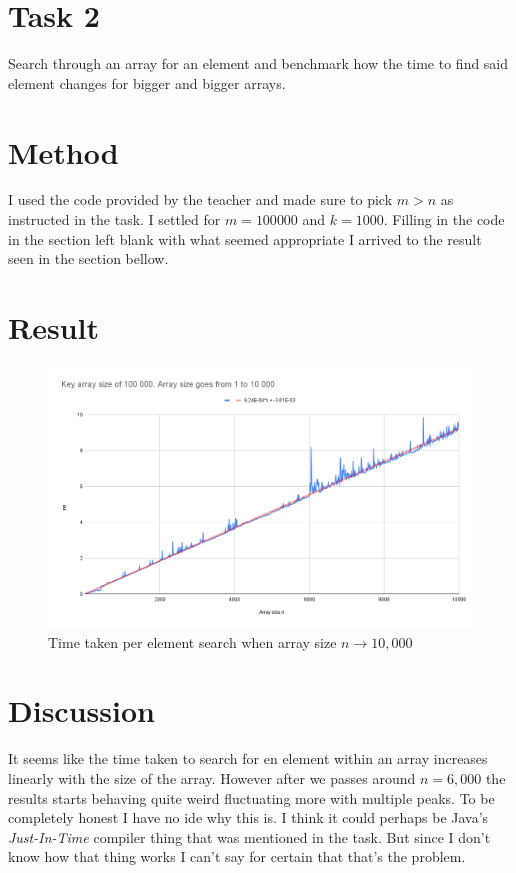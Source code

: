 \documentclass[a4paper,11pt]{article}
\begin{document}
\section*{Task 2}

Search through an array for an element and benchmark how the time to find said element changes for bigger and bigger arrays. 

\section*{Method}

I used the code provided by the teacher and made sure to pick $m > n$ as instructed in the task. I settled for $m = 100 000$ and $k = 1000$.
 Filling in the code in the section left blank with what seemed appropriate I arrived to the result seen in the section bellow. 

\section*{Result}

\begin{figure}[h]
  \begin{center}
    \includegraphics[width=\textwidth]{task2dataPlot.png}
    \caption{Time taken per element search when array size $n \to 10,000$}
    \label{fig:task2}
  \end{center}
\end{figure}

\section*{Discussion}

It seems like the time taken to search for en element within an array increases linearly with the size of the array. However after we passes around $n=6,000$ 
the results starts behaving quite weird fluctuating more with multiple peaks. To be completely honest I have no ide why this is. I think it could perhaps be Java's 
\textit{Just-In-Time} compiler thing that was mentioned in the task. But since I don't know how that thing works I can't say for certain that that's the problem.
\end{document}
